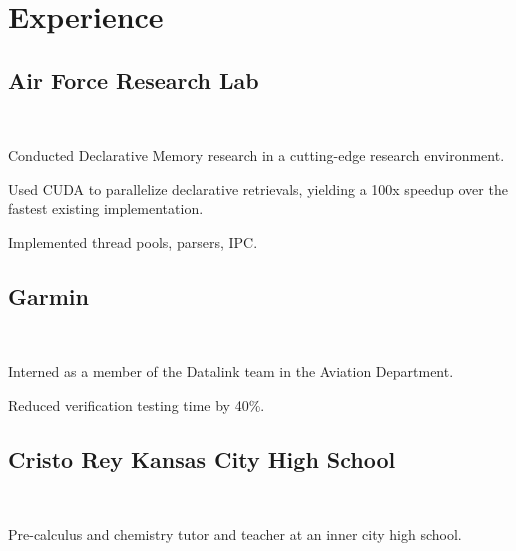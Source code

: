\documentclass[letterpaper]{deedy-resume} %
\begin{document}
\begin{minipage}[t]{0.66\textwidth}
\sectionspace %


\section{Experience}

\subsection{Air Force Research Lab}
 \hfill {} \\
\smallsectionspace
\vspace{\topsep} %
\begin{tightitemize}
\item Conducted Declarative Memory research in a cutting-edge research environment.
\item Used CUDA to parallelize declarative retrievals, yielding a 100x speedup over the fastest existing implementation.
\item Implemented thread pools, parsers, IPC.
\end{tightitemize}

\sectionspace %


\subsection{Garmin}
 \hfill {} \\
\begin{tightitemize}
\item Interned as a member of the Datalink team in the Aviation Department. 
\item Reduced verification testing time by 40\%.
\end{tightitemize}

\sectionspace %


\subsection{Cristo Rey Kansas City High School}
 \hfill {} \\
\begin{tightitemize}
\item Pre-calculus and chemistry tutor and teacher at an inner city high school. 
\end{tightitemize}


\end{minipage}
\end{document}
